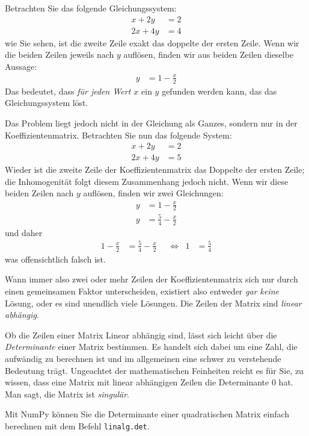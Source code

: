 \begin{hintbox}
Betrachten Sie das folgende Gleichungssystem:
\begin{align*}
	x + 2y &= 2 \\
	2x + 4y &= 4
\end{align*}
wie Sie sehen, ist die zweite Zeile exakt das doppelte der ersten Zeile. Wenn wir die beiden Zeilen jeweils nach $y$ auflösen, finden wir aus beiden Zeilen dieselbe Aussage:
\begin{align*}
	y &= 1 - \frac{x}{2}
\end{align*}
Das bedeutet, dass \emph{für jeden Wert $x$} ein $y$ gefunden werden kann, das das Gleichungssystem löst.

Das Problem liegt jedoch nicht in der Gleichung als Ganzes, sondern nur in der Koeffizientenmatrix. Betrachten Sie nun das folgende System:
\begin{align*}
	x + 2y &= 2 \\
	2x + 4y &= 5
\end{align*}
Wieder ist die zweite Zeile der Koeffizientenmatrix das Doppelte der ersten Zeile; die Inhomogenität folgt diesem Zusammenhang jedoch nicht. Wenn wir diese beiden Zeilen nach $y$ auflösen, finden wir zwei Gleichungen:
\begin{align*}
	y &= 1 - \frac{x}{2} \\
	y &= \frac{5}{4} - \frac{x}{2}
\end{align*}
und daher
\begin{align*}
	1 - \frac{x}{2} &= \frac{5}{4} - \frac{x}{2} &&\Leftrightarrow & 1 &= \frac{5}{4}
\end{align*}
was offensichtlich falsch ist.

Wann immer also zwei oder mehr Zeilen der Koeffizientenmatrix sich nur durch einen gemeinsamen Faktor unterscheiden, existiert also entweder \emph{gar keine} Lösung, oder es sind unendlich viele Lösungen. Die Zeilen der Matrix sind \emph{linear abhängig}.
\end{hintbox}

Ob die Zeilen einer Matrix Linear abhängig sind, lässt sich leicht über die \emph{Determinante} einer Matrix bestimmen. Es handelt sich dabei um eine Zahl, die aufwändig zu berechnen ist und im allgemeinen eine schwer zu verstehende Bedeutung trägt. Ungeachtet der mathematischen Feinheiten reicht es für Sie, zu wissen, dass eine Matrix mit linear abhängigen Zeilen die Determinante 0 hat. Man sagt, die Matrix ist \emph{singulär}.

Mit NumPy können Sie die Determinante einer quadratischen Matrix einfach berechnen mit dem Befehl \texttt{linalg.det}.

